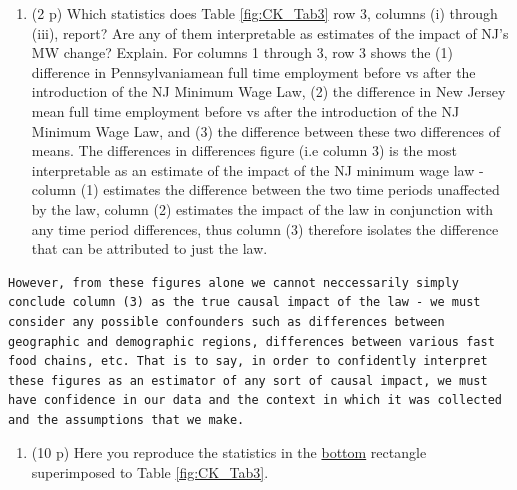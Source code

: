 \documentclass[
]{article}
\providecommand{\tightlist}{%
  \setlength{\itemsep}{0pt}\setlength{\parskip}{0pt}}
\begin{document}
\begin{enumerate}
\def\labelenumi{\alph{enumi}.}
\setcounter{enumi}{1}
\tightlist
\item
  (2 p) Which statistics does Table \ref{fig:CK_Tab3} row 3, columns (i)
  through (iii), report? Are any of them interpretable as estimates of
  the impact of NJ's MW change? Explain. For columns 1 through 3, row 3
  shows the (1) difference in Pennsylvaniamean full time employment
  before vs after the introduction of the NJ Minimum Wage Law, (2) the
  difference in New Jersey mean full time employment before vs after the
  introduction of the NJ Minimum Wage Law, and (3) the difference
  between these two differences of means. The differences in differences
  figure (i.e column 3) is the most interpretable as an estimate of the
  impact of the NJ minimum wage law - column (1) estimates the
  difference between the two time periods unaffected by the law, column
  (2) estimates the impact of the law in conjunction with any time
  period differences, thus column (3) therefore isolates the difference
  that can be attributed to just the law.
\end{enumerate}

\begin{verbatim}
However, from these figures alone we cannot neccessarily simply conclude column (3) as the true causal impact of the law - we must consider any possible confounders such as differences between geographic and demographic regions, differences between various fast food chains, etc. That is to say, in order to confidently interpret these figures as an estimator of any sort of causal impact, we must have confidence in our data and the context in which it was collected and the assumptions that we make.
\end{verbatim}

\begin{enumerate}
\def\labelenumi{\arabic{enumi}.}
\setcounter{enumi}{13}
\tightlist
\item
  (10 p) Here you reproduce the statistics in the \underline{bottom}
  rectangle superimposed to Table
  \ref{fig:CK_Tab3}.\label{item:table3-rows-4-5}
\end{enumerate}
\end{document}
